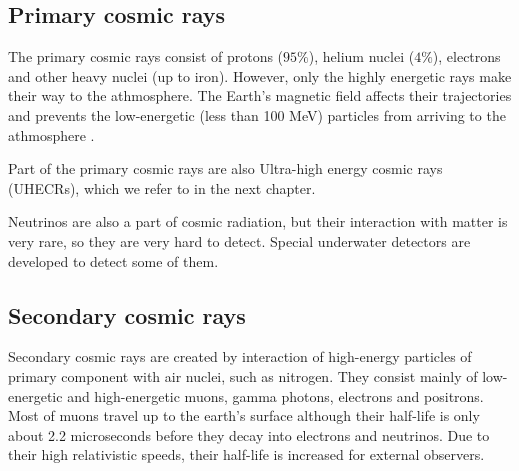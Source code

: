 \subsection{Primary cosmic rays}
The primary cosmic rays consist of protons ($95 \%$), helium nuclei ($4 \%$), electrons and other heavy nuclei (up to iron). However, only the highly energetic rays make their way to the athmosphere. The Earth's magnetic field affects their trajectories and prevents the low-energetic (less than 100 MeV) particles from arriving to the athmosphere \cite{Kliewer}. 
\par
Part of the primary cosmic rays are also Ultra-high energy cosmic rays (UHECRs), which we refer to in the next chapter.
\par 
Neutrinos are also a part of cosmic radiation, but their interaction with matter is very rare, so they are very hard to detect. Special underwater detectors are developed to detect some of them. 
\subsection{Secondary cosmic rays}
Secondary cosmic rays are created by interaction of high-energy particles of primary component with air nuclei, such as nitrogen. They consist mainly of low-energetic and high-energetic muons, gamma photons, electrons and positrons. Most of muons travel up to the earth's surface although their half-life is only about 2.2 microseconds before they decay into electrons and neutrinos. Due to their high relativistic speeds, their half-life is increased for external observers. 





